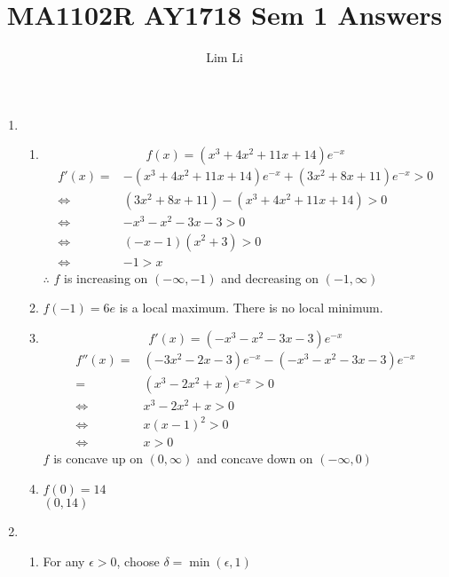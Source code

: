 \documentclass[12pt]{article}
\theoremstyle{definition}
\begin{document}
\title{MA1102R AY1718 Sem 1 Answers}
\author{Lim Li}
\maketitle
\begin{enumerate}
  \item \begin{enumerate}[label=(\roman*)]
          \item \[f(x)=(x^3+4x^2+11x+14)e^{-x}\]
		        \begin{align*}
		          f'(x) =& -(x^3+4x^2+11x+14)e^{-x} + (3x^2+8x+11)e^{-x} > 0 \\
		            \iff & (3x^2+8x+11) - (x^3+4x^2+11x+14) > 0 \\
		            \iff & -x^3 -x^2 - 3x - 3 > 0 \\
		            \iff & (-x-1)(x^2+3) > 0 \\
		            \iff & -1 > x
		        \end{align*}
		        $\therefore$ $f$ is increasing on $(-\infty,-1)$ and decreasing on $(-1,\infty)$
		  \item $f(-1)=6e$ is a local maximum. There is no local minimum.
		  \item \[f'(x)=(-x^3-x^2-3x-3)e^{-x}\]
		        \begin{align*}
		          f''(x) =& (-3x^2-2x-3)e^{-x} - (-x^3-x^2-3x-3)e^{-x} \\
		                 =& (x^3 -2x^2 +x)e^{-x} > 0 \\
		             \iff & x^3 -2x^2 + x > 0 \\
		             \iff & x(x-1)^2 > 0 \\
		             \iff & x > 0
		        \end{align*}
		        $f$ is concave up on $(0,\infty)$ and concave down on $(-\infty,0)$
		  \item $f(0)=14$ \\
		        $(0,14)$
        \end{enumerate}
  \item \begin{enumerate}[label=(\alph*)]
          \item For any $\epsilon > 0$, choose $\delta = \min(\epsilon,1)$
                

\end{enumerate}
\end{enumerate}
\end{document}
